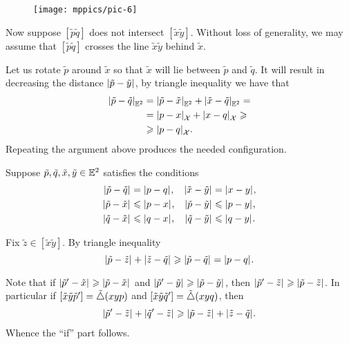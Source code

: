 \begin{wrapfigure}{o}{30 mm}
\vskip-0mm
\centering
\texttt{[image: mppics/pic-6]}
\end{wrapfigure}

Now suppose $[\tilde p \tilde q]$ does not intersect $[\tilde x\tilde y]$.
Without loss of generality, we may assume that $[\tilde p \tilde q]$ crosses the line $\tilde x\tilde y$ behind $\tilde x$.

Let us rotate $\tilde p$ around $\tilde x$ so that $\tilde x$ will lie between $\tilde p$ and $\tilde q$.
It will result in decreasing the distance $\dist{\tilde p}{\tilde y}{}$,
by triangle inequality we have that 
\begin{align*}
\dist{\tilde p}{\tilde q}{\EE^2}&=\dist{\tilde p}{\tilde x}{\EE^2}+\dist{\tilde x}{\tilde q}{\EE^2}=
\\
&=\dist{p}{x}{\spc{X}}+\dist{x}{q}{\spc{X}}\ge
\\
&\ge \dist{p}{q}{\spc{X}}.
\end{align*}
Repeating the argument above produces the needed configuration.

Suppose $\tilde p,\tilde q,\tilde x,\tilde y\in\mathbb{E}^2$ satisfies the conditions 
\begin{align*}
\dist{\tilde p}{\tilde q}{}&=\dist{p}{q}{},
&
\dist{\tilde x}{\tilde y}{}&=\dist{x}{y}{},
\\
\dist{\tilde p}{\tilde x}{}&\le \dist{p}{x}{},
&
\dist{\tilde p}{\tilde y}{}&\le \dist{p}{y}{},
\\
\dist{\tilde q}{\tilde x}{}&\le \dist{q}{x}{},
&
\dist{\tilde q}{\tilde y}{}&\le \dist{q}{y}{}.
\end{align*}

Fix $\tilde z\in [\tilde x\tilde y]$.
By triangle inequality 
\[\dist{\tilde p}{\tilde z}{}+\dist{\tilde z}{\tilde q}{}\ge \dist{\tilde p}{\tilde q}{}=\dist{p}{q}{}.\]

Note that if 
$\dist{\tilde p'}{\tilde x}{}\ge \dist{\tilde p}{\tilde x}{}$
and
$\dist{\tilde p'}{\tilde y}{}\ge \dist{\tilde p}{\tilde y}{}$,
then $\dist{\tilde p'}{\tilde z}{}\ge \dist{\tilde p}{\tilde z}{}$.
In particular if $[\tilde x\tilde y\tilde p']=\tilde\triangle(xyp)$ and $[\tilde x\tilde y\tilde q']=\tilde\triangle(xyq)$, then
\begin{align*}
 \dist{\tilde p'}{\tilde z}{}+\dist{\tilde q'}{\tilde z}{}\ge \dist{\tilde p}{\tilde z}{}+\dist{\tilde z}{\tilde q}{}.
\end{align*}
Whence the ``if'' part follows.

